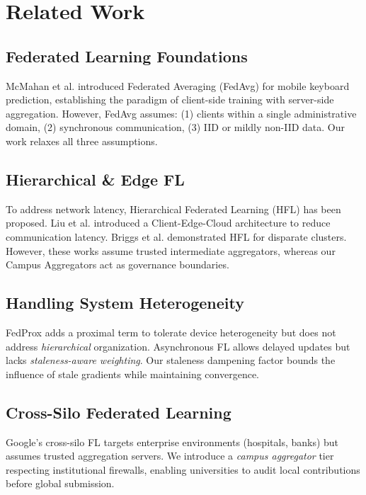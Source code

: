\documentclass[conference]{IEEEtran}
\begin{document}
\section{Related Work}

\subsection{Federated Learning Foundations}

McMahan et al. introduced Federated Averaging (FedAvg) for mobile keyboard prediction, establishing the paradigm of client-side training with server-side aggregation. However, FedAvg assumes: (1) clients within a single administrative domain, (2) synchronous communication, (3) IID or mildly non-IID data. Our work relaxes all three assumptions.

\subsection{Hierarchical \& Edge FL}
To address network latency, Hierarchical Federated Learning (HFL) has been proposed. Liu et al. introduced a Client-Edge-Cloud architecture to reduce communication latency. Briggs et al. demonstrated HFL for disparate clusters. However, these works assume trusted intermediate aggregators, whereas our Campus Aggregators act as governance boundaries.

\subsection{Handling System Heterogeneity}

FedProx adds a proximal term to tolerate device heterogeneity but does not address \textit{hierarchical} organization. Asynchronous FL allows delayed updates but lacks \textit{staleness-aware weighting}. Our staleness dampening factor bounds the influence of stale gradients while maintaining convergence.

\subsection{Cross-Silo Federated Learning}

Google's cross-silo FL targets enterprise environments (hospitals, banks) but assumes trusted aggregation servers. We introduce a \textit{campus aggregator} tier respecting institutional firewalls, enabling universities to audit local contributions before global submission.
\end{document}

